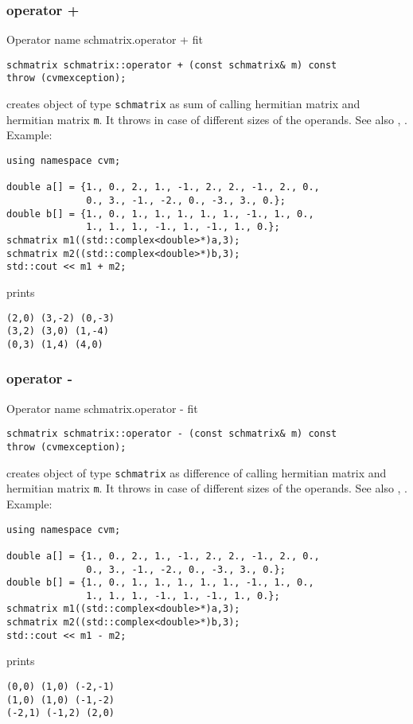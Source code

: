 \subsubsection{operator +}
Operator%
\pdfdest name {schmatrix.operator +} fit
\begin{verbatim}
schmatrix schmatrix::operator + (const schmatrix& m) const
throw (cvmexception);
\end{verbatim}
creates  object of type \verb"schmatrix" as  sum of
 calling hermitian matrix and  hermitian matrix \verb"m".
It throws  
in case of different sizes 
of the operands.
See also , .
Example:
\begin{Verbatim}
using namespace cvm;

double a[] = {1., 0., 2., 1., -1., 2., 2., -1., 2., 0.,
              0., 3., -1., -2., 0., -3., 3., 0.};
double b[] = {1., 0., 1., 1., 1., 1., 1., -1., 1., 0.,
              1., 1., 1., -1., 1., -1., 1., 0.};
schmatrix m1((std::complex<double>*)a,3);
schmatrix m2((std::complex<double>*)b,3);
std::cout << m1 + m2;
\end{Verbatim}
prints
\begin{Verbatim}
(2,0) (3,-2) (0,-3)
(3,2) (3,0) (1,-4)
(0,3) (1,4) (4,0)
\end{Verbatim}
\newpage



\subsubsection{operator -}
Operator%
\pdfdest name {schmatrix.operator -} fit
\begin{verbatim}
schmatrix schmatrix::operator - (const schmatrix& m) const
throw (cvmexception);
\end{verbatim}
creates  object of type \verb"schmatrix" as  difference of
 calling hermitian matrix and  hermitian matrix \verb"m".
It throws  
in case of different sizes 
of the operands.
See also , .
Example:
\begin{Verbatim}
using namespace cvm;

double a[] = {1., 0., 2., 1., -1., 2., 2., -1., 2., 0.,
              0., 3., -1., -2., 0., -3., 3., 0.};
double b[] = {1., 0., 1., 1., 1., 1., 1., -1., 1., 0.,
              1., 1., 1., -1., 1., -1., 1., 0.};
schmatrix m1((std::complex<double>*)a,3);
schmatrix m2((std::complex<double>*)b,3);
std::cout << m1 - m2;
\end{Verbatim}
prints
\begin{Verbatim}
(0,0) (1,0) (-2,-1)
(1,0) (1,0) (-1,-2)
(-2,1) (-1,2) (2,0)
\end{Verbatim}
\newpage




